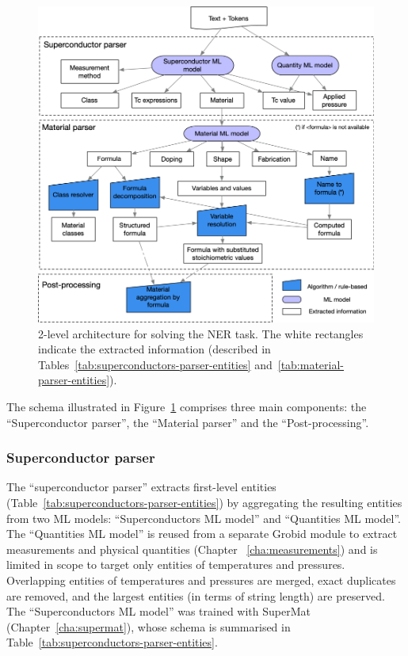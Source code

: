 \begin{figure}[htbp]
    \includegraphics[width=\textwidth]{figures/automatic_extraction_supercon/schema-extraction-colors}
    \caption{\label{fig:extraction-ml-models-cascade-architecture} 2-level architecture for solving the NER task. The white rectangles indicate the extracted information (described in Tables~\ref{tab:superconductors-parser-entities} and~\ref{tab:material-parser-entities}).}
\end{figure}

The schema illustrated in Figure~\ref{fig:extraction-ml-models-cascade-architecture} comprises three main components: the ``Superconductor parser'', the ``Material parser'' and the ``Post-processing''. 

\subsubsection{Superconductor parser}
\label{Superconductor parser}
The ``superconductor parser'' extracts first-level entities (Table~\ref{tab:superconductors-parser-entities}) by aggregating the resulting entities from two ML models: ``Superconductors ML model'' and ``Quantities ML model''.
The ``Quantities ML model'' is reused from a separate Grobid module to extract measurements and physical quantities (Chapter ~\ref{cha:measurements}) and is limited in scope to target only entities of temperatures and pressures.
Overlapping entities of temperatures and pressures are merged, exact duplicates are removed, and the largest entities (in terms of string length) are preserved.
The ``Superconductors ML model'' was trained with SuperMat (Chapter~\ref{cha:supermat}), whose schema is summarised in Table~\ref{tab:superconductors-parser-entities}.

